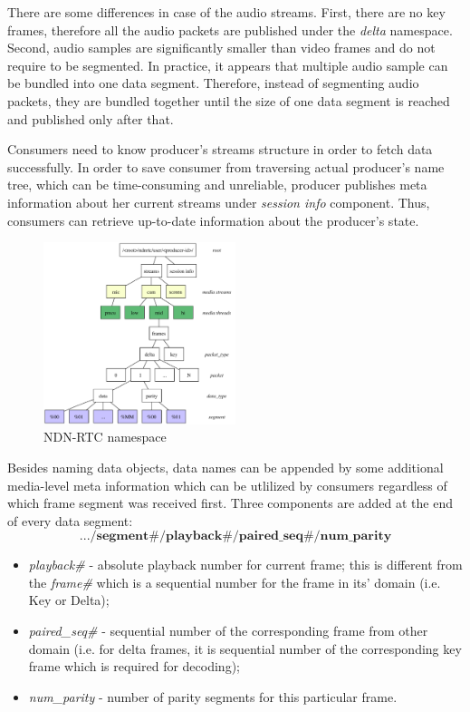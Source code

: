 \documentclass[10pt]{proc}
\begin{document}
There are some differences in case of the audio streams. First, there are no key frames, therefore all the audio packets are published under the \textit{delta} namespace. Second, audio samples are significantly smaller than video frames and do not require to be segmented. In practice, it appears that multiple audio sample can be bundled into one data segment. Therefore, instead of segmenting audio packets, they are bundled together until the size of one data segment is reached and published only after that.

Consumers need to know producer's streams structure in order to fetch data successfully. In order to save consumer from traversing actual producer's name tree, which can be time-consuming and unreliable, producer publishes meta information about her current streams under \textit{session info} component. Thus, consumers can retrieve up-to-date information about the producer's state.

\begin{figure}[Ht!]
\centering
\includegraphics[width=0.5\textwidth]{namespace}
\caption{NDN-RTC namespace}
\label{fig:namespace}
\end{figure}

Besides naming data objects, data names can be appended by some additional media-level meta information which can be utlilized by consumers regardless of which frame segment was received first. Three components are added at the end of every data segment:
\small\begin{equation}
.../\textbf{segment\#}/\textbf{playback\#}/\textbf{paired\_seq\#}/\textbf{num\_parity} \nonumber
\end{equation}\normalsize
\begin{itemize}
\item \textit{playback\#} - absolute playback number for current frame; this is different from the \textit{frame\#} which is a sequential number for the frame in its' domain (i.e. Key or Delta);
\item \textit{paired\_seq\#} - sequential number of the corresponding frame from other domain (i.e. for delta frames, it is sequential number of the corresponding key frame which is required for decoding);
\item \textit{num\_parity} - number of parity segments for this particular frame.
\end{itemize}
\end{document}
